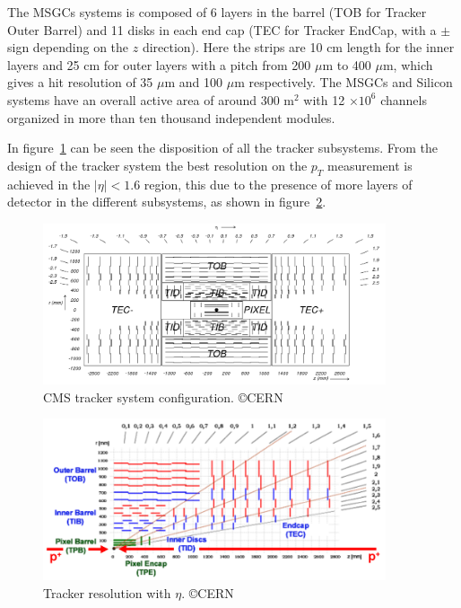 The MSGCs systems is composed of 6 layers in the barrel (TOB for Tracker Outer Barrel) and 11 disks in each end cap (TEC for Tracker EndCap, with a $\pm$ sign depending on the $z$ direction). Here the strips are 10 cm length for the inner layers and 25 cm for outer layers with a pitch from 200 $\mu$m to 400 $\mu$m, which gives a hit resolution of 35 $\mu$m and 100 $\mu$m respectively. The MSGCs and Silicon systems have an overall active area of around 300 $\text{m}^{2}$ with 12 $\times10^{6}$ channels organized in more than ten thousand independent modules.

In figure~\ref{fig:cmstracker} can be seen the disposition of all the tracker subsystems. From the design of the tracker system the best resolution on the $p_{T}$ measurement is achieved in the $|\eta|<1.6$ region, this due to the presence of more layers of detector in the different subsystems, as shown in figure~\ref{fig:trackerres}. 

\begin{figure}[!Hhtbp]
  \begin{center}
    \includegraphics[width=0.9\textwidth]{figs/fig_cmstracker.png}
    \caption{CMS tracker system configuration. \copyright CERN}
    \label{fig:cmstracker}
  \end{center}
\end{figure}

\begin{figure}[!Hhtbp]
  \begin{center}
    \includegraphics[width=0.9\textwidth]{figs/tracker_resolution.png}
    \caption{Tracker resolution with $\eta$. \copyright CERN}
    \label{fig:trackerres}
  \end{center}
\end{figure}

